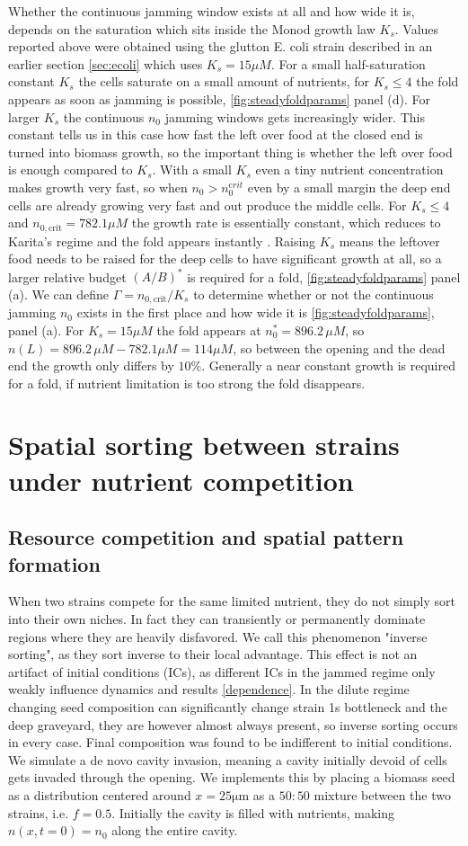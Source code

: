 \documentclass[11pt,a4paper]{report}
\begin{document}
	Whether the continuous jamming window exists at all and how wide it is, depends on the saturation which sits inside the Monod growth law $K_s$. Values reported above were obtained using the glutton E. coli strain described in an earlier section \ref{sec:ecoli} which uses $K_s=15 \mu M$. For a small half-saturation constant $K_s$ the cells saturate on a small amount of nutrients, for $K_s\le4$ the fold appears as soon as jamming is possible, \ref{fig:steadyfoldparams} panel (d). For larger $K_s$ the continuous $n_0$ jamming windows gets increasingly wider. This constant tells us in this case how fast the left over food at the closed end is turned into biomass growth, so the important thing is whether the left over food is enough compared to $K_s$. With a small $K_s$ even a tiny nutrient concentration makes growth very fast, so when $n_0>n_0^{\mathrm crit}$ even by a small margin the deep end cells are already growing very fast and out produce the middle cells. For $K_s\le4$ and $n_{0,\mathrm{crit}}=782.1\mu M$ the growth rate is essentially constant, which reduces to Karita's regime and the fold appears instantly \cite{Karita}. Raising $K_s$ means the leftover food needs to be raised for the deep cells to have significant growth at all, so a larger relative budget $(A/B)^*$ is required for a fold, \ref{fig:steadyfoldparams} panel (a). We can define $\Gamma=n_{0,\mathrm{crit}}/K_s$ to determine whether or not the continuous jamming $n_0$ exists in the first place and how wide it is \ref{fig:steadyfoldparams}, panel (a). For $K_s=15 \mu M$ the fold appears at $n_0^{*}=896.2\,\mu M$, so $n(L)=896.2\,\mu M-782.1\mu M=114\mu M$, so between the opening and the dead end the growth only differs by $10\%$. Generally a near constant growth is required for a fold, if nutrient limitation is too strong the fold disappears.
	\newpage 
	\section{Spatial sorting between strains under nutrient competition}
		\subsection{Resource competition and spatial pattern formation}
	When two strains compete for the same limited nutrient, they do not simply sort into their own niches. In fact they can transiently or permanently dominate regions where they are heavily disfavored. We call this phenomenon "inverse sorting", as they sort inverse to their local advantage. This effect is not an artifact of initial conditions (ICs), as different ICs in the jammed regime only weakly influence dynamics and results \ref{dependence}. In the dilute regime changing seed composition can significantly change strain 1s bottleneck and the deep graveyard, they are however almost always present, so inverse sorting occurs in every case. Final composition was found to be indifferent to initial conditions.  We simulate a de novo cavity invasion, meaning a cavity initially devoid of cells gets invaded through the opening. We implements this by placing a biomass seed as a distribution centered around $x=25 \mathrm{\mu m}$ as a $50:50$ mixture between the two strains, i.e. $f=0.5$. Initially the cavity is filled with nutrients, making $n(x,t=0)=n_0$ along the entire cavity. 
\end{document}
